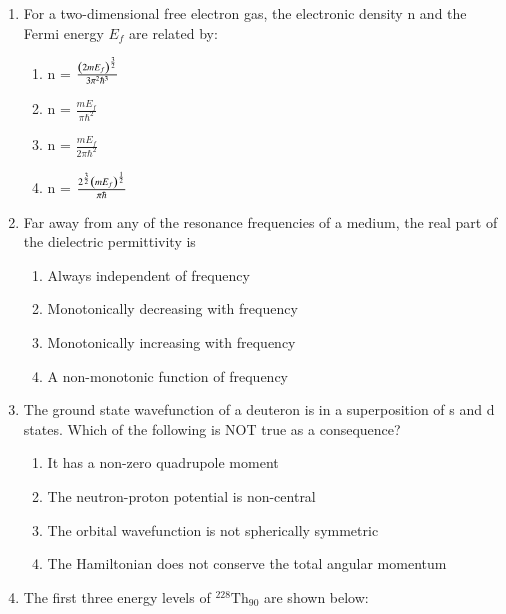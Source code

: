 \documentclass[journal]{IEEEtran}
\begin{document}
\begin{enumerate}[start=27]
\item For a two-dimensional free electron gas, the electronic density n and the Fermi energy $E_f$ are related by:
\begin{multicols}{2}
\begin{enumerate}
\item n = $\frac{\left(2mE_f\right)^{\frac{3}{2}}}{3\pi^2\hbar^3}$\\

\item n = $\frac{mE_f}{\pi\hbar^2}$

\item n = $\frac{mE_f}{2\pi\hbar^2}$\\

\item n = $\frac{2^{\frac{3}{2}}\left(mE_f\right)^{\frac{1}{2}}}{\pi\hbar}$

\end{enumerate}
\end{multicols}

\item Far away from any of the resonance frequencies of a medium, the real part of the dielectric permittivity is
\begin{enumerate}
\item Always independent of frequency
\item Monotonically decreasing with frequency
\item Monotonically increasing with frequency
\item A non-monotonic function of frequency
\end{enumerate}

\item The ground state wavefunction of a deuteron is in a superposition of s and d states. Which of the following is NOT true as a consequence?
\begin{enumerate}
\item It has a non-zero quadrupole moment
\item The neutron-proton potential is non-central
\item The orbital wavefunction is not spherically symmetric
\item The Hamiltonian does not conserve the total angular momentum
\end{enumerate}

\item The first three energy levels of $^{228}\text{Th}_{90}$ are shown below:


\end{enumerate}
\end{document}
